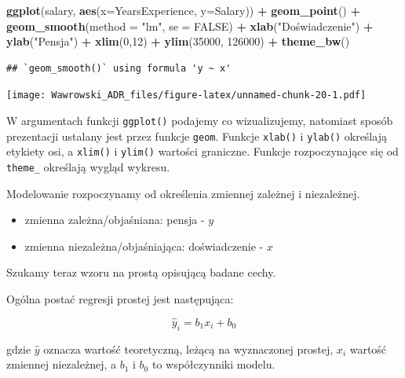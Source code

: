 \documentclass[
]{book}
\newenvironment{Shaded}{\begin{snugshade}}{\end{snugshade}}
\newcommand{\DataTypeTok}[1]{\textcolor[rgb]{0.13,0.29,0.53}{#1}}
\newcommand{\DecValTok}[1]{\textcolor[rgb]{0.00,0.00,0.81}{#1}}
\newcommand{\KeywordTok}[1]{\textcolor[rgb]{0.13,0.29,0.53}{\textbf{#1}}}
\newcommand{\NormalTok}[1]{#1}
\newcommand{\OperatorTok}[1]{\textcolor[rgb]{0.81,0.36,0.00}{\textbf{#1}}}
\newcommand{\OtherTok}[1]{\textcolor[rgb]{0.56,0.35,0.01}{#1}}
\newcommand{\StringTok}[1]{\textcolor[rgb]{0.31,0.60,0.02}{#1}}
\providecommand{\tightlist}{%
  \setlength{\itemsep}{0pt}\setlength{\parskip}{0pt}}
\begin{document}
\begin{Shaded}
\begin{Highlighting}[]
\KeywordTok{ggplot}\NormalTok{(salary, }\KeywordTok{aes}\NormalTok{(}\DataTypeTok{x=}\NormalTok{YearsExperience, }\DataTypeTok{y=}\NormalTok{Salary)) }\OperatorTok{+}\StringTok{ }
\StringTok{  }\KeywordTok{geom_point}\NormalTok{() }\OperatorTok{+}
\StringTok{  }\KeywordTok{geom_smooth}\NormalTok{(}\DataTypeTok{method =} \StringTok{"lm"}\NormalTok{, }\DataTypeTok{se =} \OtherTok{FALSE}\NormalTok{) }\OperatorTok{+}
\StringTok{  }\KeywordTok{xlab}\NormalTok{(}\StringTok{"Doświadczenie"}\NormalTok{) }\OperatorTok{+}\StringTok{ }
\StringTok{  }\KeywordTok{ylab}\NormalTok{(}\StringTok{"Pensja"}\NormalTok{) }\OperatorTok{+}
\StringTok{  }\KeywordTok{xlim}\NormalTok{(}\DecValTok{0}\NormalTok{,}\DecValTok{12}\NormalTok{) }\OperatorTok{+}
\StringTok{  }\KeywordTok{ylim}\NormalTok{(}\DecValTok{35000}\NormalTok{, }\DecValTok{126000}\NormalTok{) }\OperatorTok{+}
\StringTok{  }\KeywordTok{theme_bw}\NormalTok{()}
\end{Highlighting}
\end{Shaded}

\begin{verbatim}
## `geom_smooth()` using formula 'y ~ x'
\end{verbatim}

\texttt{[image: Wawrowski\_ADR\_files/figure-latex/unnamed-chunk-20-1.pdf]}

W argumentach funkcji \texttt{ggplot()} podajemy co wizualizujemy, natomiast sposób prezentacji ustalany jest przez funkcje \texttt{geom}. Funkcje \texttt{xlab()} i \texttt{ylab()} określają etykiety osi, a \texttt{xlim()} i \texttt{ylim()} wartości graniczne. Funkcje rozpoczynające się od \texttt{theme\_} określają wygląd wykresu.

Modelowanie rozpoczynamy od określenia zmiennej zależnej i niezależnej.

\begin{itemize}
\tightlist
\item
  zmienna zależna/objaśniana: pensja - \(y\)
\item
  zmienna niezależna/objaśniająca: doświadczenie - \(x\)
\end{itemize}

Szukamy teraz wzoru na prostą opisującą badane cechy.

Ogólna postać regresji prostej jest następująca:

\[\hat{y}_{i}=b_{1}x_{i}+b_{0}\]

gdzie \(\hat{y}\) oznacza wartość teoretyczną, leżącą na wyznaczonej prostej, \(x_i\) wartość zmiennej niezależnej, a \(b_1\) i \(b_0\) to współczynniki modelu.
\end{document}
